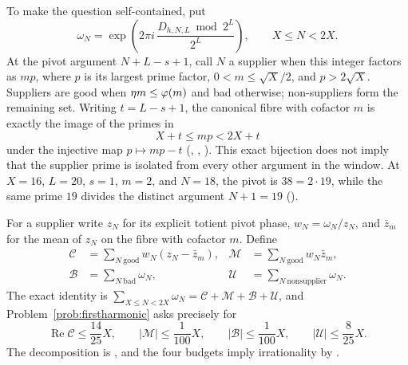 \documentclass[11pt]{article}
\begin{document}
To make the question self-contained, put
\[
 \omega_N=\exp\!\left(2\pi i\,
   \frac{D_{h,N,L}\bmod 2^L}{2^L}\right),\qquad X\le N<2X.
\]
At the pivot argument $N+L-s+1$, call $N$ a supplier when this integer factors
as $mp$, where $p$ is its largest prime factor,
$0<m\le\sqrt X/2$, and $p>2\sqrt X$.  Suppliers are good when
$\eta m\le\varphi(m)$ and bad otherwise; non-suppliers form the remaining set.
Writing $t=L-s+1$, the canonical fibre with cofactor $m$ is exactly the image
of the primes in
\[
 X+t\le mp<2X+t
\]
under the injective map $p\mapsto mp-t$
(,
,
).
This exact bijection does not imply that the supplier prime is isolated from
every other argument in the window.  At $X=16$, $L=20$, $s=1$, $m=2$, and
$N=18$, the pivot is $38=2\cdot19$, while the same prime $19$ divides the
distinct argument $N+1=19$
().

For a supplier write $z_N$ for its explicit totient pivot phase,
$w_N=\omega_N/z_N$, and $\bar z_m$ for the mean of $z_N$ on the fibre with
cofactor $m$.  Define
\[
\begin{aligned}
 \mathcal C&=\sum_{N\ {\mathrm{good}}}w_N(z_N-\bar z_m),&
 \mathcal M&=\sum_{N\ {\mathrm{good}}}w_N\bar z_m,\\
 \mathcal B&=\sum_{N\ {\mathrm{bad}}}\omega_N,&
 \mathcal U&=\sum_{N\ {\mathrm{nonsupplier}}}\omega_N.
\end{aligned}
\]
The exact identity is
$\sum_{X\le N<2X}\omega_N=\mathcal C+\mathcal M+\mathcal B+\mathcal U$, and
Problem~\ref{prob:firstharmonic} asks precisely for
\[
 \operatorname{Re}\mathcal C\le\frac{14}{25}X,\qquad
 |\mathcal M|\le\frac1{100}X,\qquad
 |\mathcal B|\le\frac1{100}X,\qquad
 |\mathcal U|\le\frac8{25}X.
\]
The decomposition is
,
and the four budgets imply irrationality by
.
\end{document}
